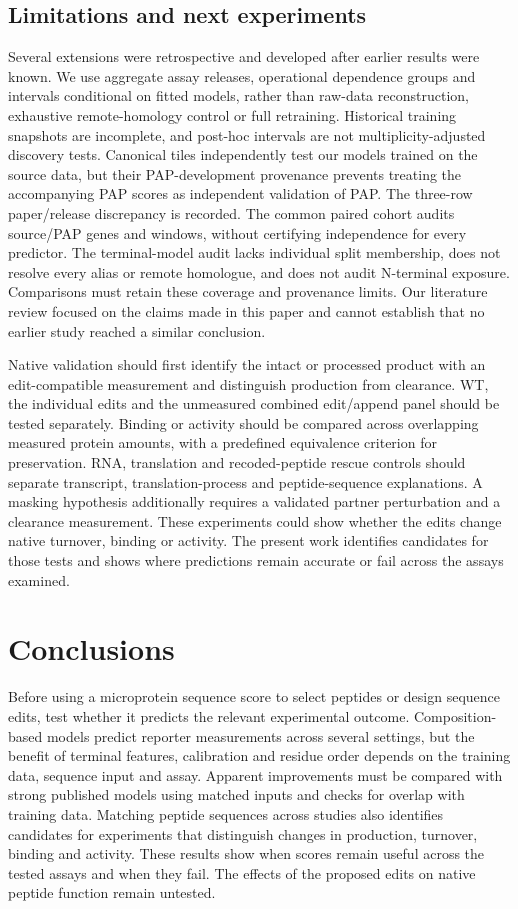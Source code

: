 \documentclass[11pt,a4paper]{article}
\begin{document}
\subsection{Limitations and next experiments}
Several extensions were retrospective and developed after earlier results were known. We use aggregate
assay releases, operational dependence groups and intervals conditional on
fitted models, rather than raw-data reconstruction, exhaustive remote-homology
control or full retraining. Historical training snapshots are incomplete,
and post-hoc intervals are not multiplicity-adjusted discovery tests.
Canonical tiles independently test our models trained on the source data, but their
PAP-development provenance prevents treating the accompanying PAP scores
as independent validation of PAP. The three-row paper/release discrepancy
is recorded. The common paired cohort audits source/PAP genes and windows,
without certifying independence for every predictor. The terminal-model
audit lacks individual split membership, does not resolve every alias or
remote homologue, and does not audit N-terminal exposure. Comparisons must
retain these coverage and provenance limits. Our literature review focused on the claims made in this paper and cannot establish that no earlier study reached a similar conclusion.

Native validation should first identify the intact or processed product
with an edit-compatible measurement and distinguish production from
clearance. WT, the individual edits and the unmeasured combined edit/append
panel should be tested separately. Binding or activity should be compared
across overlapping measured protein amounts, with a predefined equivalence
criterion for preservation. RNA, translation and recoded-peptide rescue
controls should separate transcript, translation-process and peptide-sequence
explanations. A masking hypothesis additionally requires a validated partner
perturbation and a clearance measurement. These experiments could show whether the edits change native turnover, binding or activity. The present work identifies candidates for those tests and shows where predictions remain accurate or fail across the assays examined.

\section{Conclusions}
Before using a microprotein sequence score to select peptides or design sequence edits, test whether it predicts the relevant experimental outcome. Composition-based models predict reporter measurements across several settings, but the benefit of terminal features, calibration and residue order depends on the training data, sequence input and assay. Apparent improvements must be compared with strong published models using matched inputs and checks for overlap with training data. Matching peptide sequences across studies also identifies candidates for experiments that distinguish changes in production, turnover, binding and activity. These results show when scores remain useful across the tested assays and when they fail. The effects of the proposed edits on native peptide function remain untested.
\end{document}
